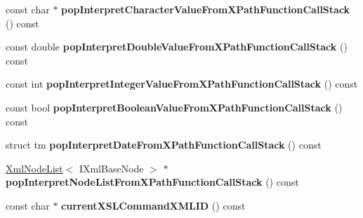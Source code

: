 \begin{DoxyCompactItemize}
\item 
\hypertarget{classgeneral__server_1_1LibXslXPathFunctionContext_a0e6f4e00e80ef122a978dc7a77510185}{const char $\ast$ {\bfseries pop\-Interpret\-Character\-Value\-From\-X\-Path\-Function\-Call\-Stack} () const }\label{classgeneral__server_1_1LibXslXPathFunctionContext_a0e6f4e00e80ef122a978dc7a77510185}

\item 
\hypertarget{classgeneral__server_1_1LibXslXPathFunctionContext_aafad8565966b962bd1c870155dec810c}{const double {\bfseries pop\-Interpret\-Double\-Value\-From\-X\-Path\-Function\-Call\-Stack} () const }\label{classgeneral__server_1_1LibXslXPathFunctionContext_aafad8565966b962bd1c870155dec810c}

\item 
\hypertarget{classgeneral__server_1_1LibXslXPathFunctionContext_a1c753ae7016300d4c06a145de8984f8b}{const int {\bfseries pop\-Interpret\-Integer\-Value\-From\-X\-Path\-Function\-Call\-Stack} () const }\label{classgeneral__server_1_1LibXslXPathFunctionContext_a1c753ae7016300d4c06a145de8984f8b}

\item 
\hypertarget{classgeneral__server_1_1LibXslXPathFunctionContext_a3cf57a24fc8ba7590da674a521b69be3}{const bool {\bfseries pop\-Interpret\-Boolean\-Value\-From\-X\-Path\-Function\-Call\-Stack} () const }\label{classgeneral__server_1_1LibXslXPathFunctionContext_a3cf57a24fc8ba7590da674a521b69be3}

\item 
\hypertarget{classgeneral__server_1_1LibXslXPathFunctionContext_a406bfd601a0996540c3aa68b679032ff}{struct tm {\bfseries pop\-Interpret\-Date\-From\-X\-Path\-Function\-Call\-Stack} () const }\label{classgeneral__server_1_1LibXslXPathFunctionContext_a406bfd601a0996540c3aa68b679032ff}

\item 
\hypertarget{classgeneral__server_1_1LibXslXPathFunctionContext_a719fb1640d45528270edacace9240607}{\hyperlink{classgeneral__server_1_1XmlNodeList}{\-Xml\-Node\-List}$<$ \-I\-Xml\-Base\-Node $>$ $\ast$ {\bfseries pop\-Interpret\-Node\-List\-From\-X\-Path\-Function\-Call\-Stack} () const }\label{classgeneral__server_1_1LibXslXPathFunctionContext_a719fb1640d45528270edacace9240607}

\item 
\hypertarget{classgeneral__server_1_1LibXslXPathFunctionContext_a2168e876f63d63f043362fdbabd66883}{const char $\ast$ {\bfseries current\-X\-S\-L\-Command\-X\-M\-L\-I\-D} () const }\label{classgeneral__server_1_1LibXslXPathFunctionContext_a2168e876f63d63f043362fdbabd66883}

\end{DoxyCompactItemize}
